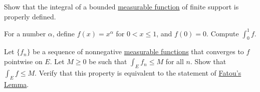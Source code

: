   \begin{exercise}[Royden 4.18]
    Show that the integral of a bounded \hyperref[def:measurable-function]{measurable function} of finite support is properly defined.
  \end{exercise}

  \begin{exercise}[Royden 4.19]
    For a number $\alpha$, define $f(x) = x^{\alpha}$ for $0 < x \leq 1$, and $f(0) = 0$. Compute $\int_0^1 f$.
  \end{exercise}

  \begin{exercise}[Royden 4.20]
    Let $\{f_n\}$ be a sequence of nonnegative \hyperref[def:measurable-function]{measurable functions} that converges to $f$ pointwise on $E$. Let $M \geq 0$ be such that $\int_E f_n \leq M$ for all $n$. Show that $\int_E f \leq M$. Verify that this property is equivalent to the statement of \hyperref[thm:fatous-lemma]{Fatou's Lemma}.
  \end{exercise}

